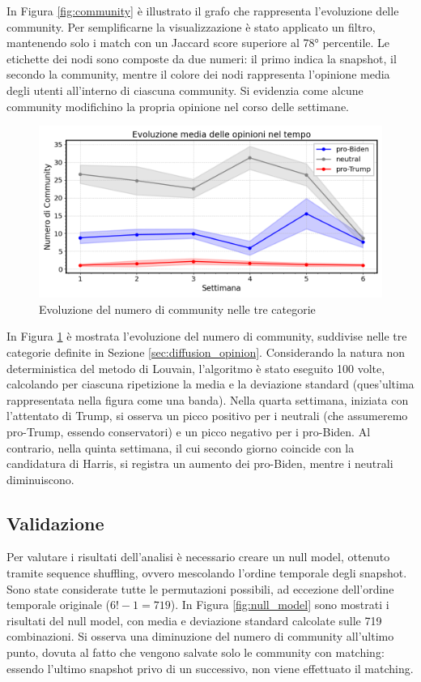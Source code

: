 \documentclass[sigchi]{acmart}
\begin{document}
In Figura \ref{fig:community} è illustrato il grafo che rappresenta l'evoluzione delle community. Per semplificarne la visualizzazione è stato applicato un filtro, mantenendo solo i match con un Jaccard score superiore al 78° percentile. Le etichette dei nodi sono composte da due numeri: il primo indica la snapshot, il secondo la community, mentre il colore dei nodi rappresenta l'opinione media degli utenti all'interno di ciascuna community. Si evidenzia come alcune community modifichino la propria opinione nel corso delle settimane.

\begin{figure}[h]
    \centering
    \includegraphics[width=\linewidth]{img/Evoluzione_opinioni_medie.png}
    \caption{Evoluzione del numero di community nelle tre categorie} \label{fig:num_community}
\end{figure}

In Figura \ref{fig:num_community} è mostrata l'evoluzione del numero di community, suddivise nelle tre categorie definite in Sezione \ref{sec:diffusion_opinion}. Considerando la natura non deterministica del metodo di Louvain, l'algoritmo è stato eseguito 100 volte, calcolando per ciascuna ripetizione la media e la deviazione standard (ques'ultima rappresentata nella figura come una banda). Nella quarta settimana, iniziata con l'attentato di Trump, si osserva un picco positivo per i neutrali (che assumeremo pro-Trump, essendo conservatori) e un picco negativo per i pro-Biden. Al contrario, nella quinta settimana, il cui secondo giorno coincide con la candidatura di Harris, si registra un aumento dei pro-Biden, mentre i neutrali diminuiscono.

\subsection{Validazione}
Per valutare i risultati dell'analisi è necessario creare un null model, ottenuto tramite sequence shuffling, ovvero mescolando l'ordine temporale degli snapshot. Sono state considerate tutte le permutazioni possibili, ad eccezione dell'ordine temporale originale ($6! - 1 = 719$). In Figura \ref{fig:null_model} sono mostrati i risultati del null model, con media e deviazione standard calcolate sulle 719 combinazioni. Si osserva una diminuzione del numero di community all'ultimo punto, dovuta al fatto che vengono salvate solo le community con matching: essendo l'ultimo snapshot privo di un successivo, non viene effettuato il matching.
\end{document}
